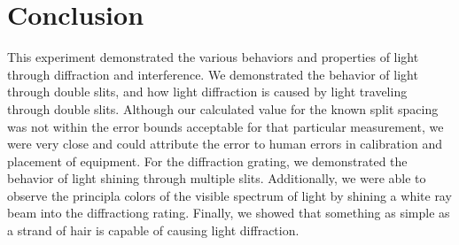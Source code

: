 \documentclass{article}
\begin{document}
\section{Conclusion}
This experiment demonstrated the various behaviors and properties of light
through diffraction and interference. We demonstrated the behavior of light
through double slits, and how light diffraction is caused by light traveling
through double slits. Although our calculated value for the known split spacing
was not within the error bounds acceptable for that particular measurement, we
were very close and could attribute the error to human errors in calibration and
placement of equipment. For the diffraction grating, we demonstrated the
behavior of light shining through multiple slits. Additionally, we were able to
observe the principla colors of the visible spectrum of light by shining a white
ray beam into the diffractiong rating. Finally, we showed that something as
simple as a strand of hair is capable of causing light diffraction.
\end{document}
